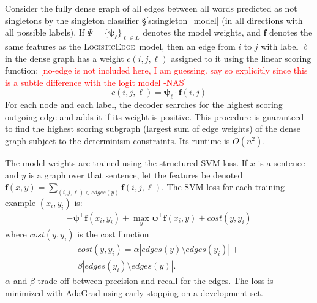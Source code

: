 \documentclass[11pt]{article}
\DeclareMathOperator*{\argmax}{arg\,max}
\newcommand{\nas}[1]{\textcolor{red}{[#1 -NAS]}}
\newcommand{\logitedge}{\textsc{LogisticEdge}}
\begin{document}
Consider the fully dense graph of all edges between all words predicted
as not singletons by the singleton classifier \S\ref{s:singleton_model} (in all
directions with all possible labels).
If $\Psi = \{\bm\psi_\ell\}_{\ell \in L}$ denotes the model
weights, and $\bm{f}$ denotes the same features as the
\logitedge~model, then an edge from $i$ to $j$ with label $\ell$ in the
dense graph has a weight $c(i,j,\ell)$ assigned to it using the linear
scoring function: \nas{no-edge is not included here, I am guessing.
  say so explicitly since this is a subtle difference with the logit model}
\[
c(i,j,\ell) = \bm\psi_\ell \cdot \bm{f}(i,j)
\]
For each node and each label, the decoder searches for
the highest scoring outgoing edge and adds it if its weight is
positive.
This procedure is guaranteed to find the highest scoring subgraph (largest sum
of edge weights) of the dense graph subject to the determinism constraints.
Its runtime is $O(n^2)$.



The model weights are trained using the structured SVM loss.  If $x$
is a sentence and $y$ is a graph over that sentence, let the features 
be denoted $\bm{f}(x,y) = \sum_{(i,j,\ell) \in edges(y)}
\bm{f}(i,j,\ell)$.  The SVM loss for each training example $(x_i, y_i)$ is:
\begin{multline*}
-\bm\psi^\top \bm{f}(x_i,y_i) + \max_{y} \bm\psi^\top \bm{f}(x_i,y) +
\mathit{cost}(y,y_i)
\end{multline*}
where $\mathit{cost}(y,y_i)$
is the cost function
\begin{multline*}
\mathit{cost}(y,y_i) = \alpha |edges(y)\setminus edges(y_i)| + \\
\beta |edges(y_i)\setminus edges(y)|.
\end{multline*}
$\alpha$ and $\beta$ trade off between precision and recall for the
edges.  The loss is minimized with AdaGrad
using early-stopping on a development set. %
\end{document}
